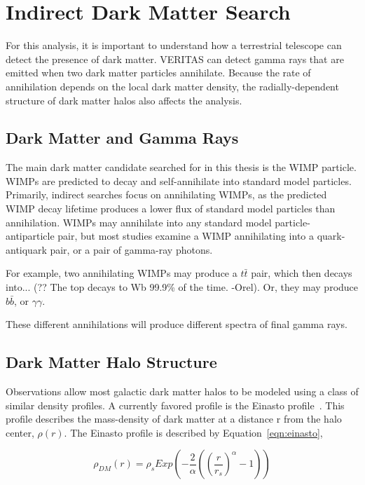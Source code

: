 \section{Indirect Dark Matter Search}
  For this analysis, it is important to understand how a terrestrial telescope can detect the presence of dark matter.
  VERITAS can detect gamma rays that are emitted when two dark matter particles annihilate.
  Because the rate of annihilation depends on the local dark matter density, the radially-dependent structure of dark matter halos also affects the analysis.

  \subsection{Dark Matter and Gamma Rays}
    The main dark matter candidate searched for in this thesis is the WIMP particle.
    WIMPs are predicted to decay and self-annihilate into standard model particles.
    Primarily, indirect searches focus on annihilating WIMPs, as the predicted WIMP decay lifetime produces a lower flux of standard model particles than annihilation.
    WIMPs may annihilate into any standard model particle-antiparticle pair, but most studies examine a WIMP annihilating into a quark-antiquark pair, or a pair of gamma-ray photons.

    For example, two annihilating WIMPs may produce a $t\bar{t}$ pair, which then decays into... {\color{red}(?? The top decays to Wb 99.9\% of the time. -Orel)}.
    Or, they may produce $b\bar{b}$, or $\gamma\gamma$.

    These different annihilations will produce different spectra of final gamma rays.
  
  \subsection{Dark Matter Halo Structure}\label{dm_spatial}
    Observations allow most galactic dark matter halos to be modeled using a class of similar density profiles.
    A currently favored profile is the Einasto profile~\cite{einastoprofile1,einastoprofile2}.
    This profile describes the mass-density of dark matter at a distance r from the halo center, $\rho(r)$.
    The Einasto profile is described by Equation~\ref{eqn:einasto},

    \begin{equation} \label{eqn:einasto}
      \rho_{DM} \left( r \right) = \rho_{s} Exp \left( - \frac{2}{\alpha} \left( {\left( \frac{r}{r_s} \right)}^{\alpha} - 1 \right) \right)
    \end{equation}
    

